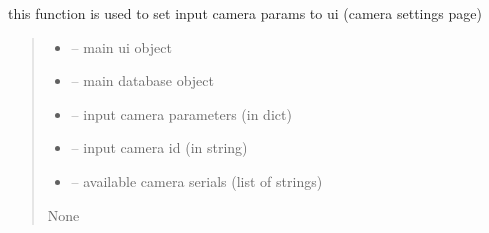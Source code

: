 \documentclass[letterpaper,10pt,english]{sphinxmanual}
\begin{document}
\begin{savenotes}\begin{fulllineitems}
\label{\detokenize{setting/backend/camera_funcs:oxin.backend.camera_funcs.set_camera_params_to_ui}}
\pysigstartsignatures
{}
\pysigstopsignatures
\sphinxAtStartPar
this function is used to set input camera params to ui (camera settings page)
\begin{quote}\begin{description}
\begin{itemize}
\item {} 
\sphinxAtStartPar
{} – main ui object

\item {} 
\sphinxAtStartPar
{} – main database object

\item {} 
\sphinxAtStartPar
{} – input camera parameters (in dict)

\item {} 
\sphinxAtStartPar
{} – input camera id (in string)

\item {} 
\sphinxAtStartPar
{} – available camera serials (list of strings)

\end{itemize}

\sphinxAtStartPar
None

\end{description}\end{quote}

\end{fulllineitems}\end{savenotes}

\end{document}
